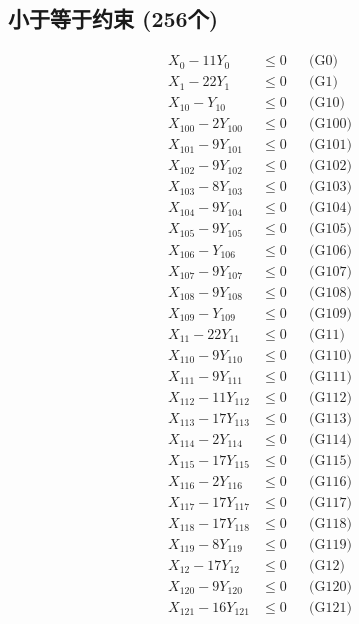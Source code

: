\documentclass[a4paper,10pt]{article}
\begin{document}
\subsection{小于等于约束 (256个)}

\allowdisplaybreaks
{\small\begin{align}
X_{0} - 11Y_{0} &\leq 0 && \text{(G0)} \\
X_{1} - 22Y_{1} &\leq 0 && \text{(G1)} \\
X_{10} - Y_{10} &\leq 0 && \text{(G10)} \\
X_{100} - 2Y_{100} &\leq 0 && \text{(G100)} \\
X_{101} - 9Y_{101} &\leq 0 && \text{(G101)} \\
X_{102} - 9Y_{102} &\leq 0 && \text{(G102)} \\
X_{103} - 8Y_{103} &\leq 0 && \text{(G103)} \\
X_{104} - 9Y_{104} &\leq 0 && \text{(G104)} \\
X_{105} - 9Y_{105} &\leq 0 && \text{(G105)} \\
X_{106} - Y_{106} &\leq 0 && \text{(G106)} \\
X_{107} - 9Y_{107} &\leq 0 && \text{(G107)} \\
X_{108} - 9Y_{108} &\leq 0 && \text{(G108)} \\
X_{109} - Y_{109} &\leq 0 && \text{(G109)} \\
X_{11} - 22Y_{11} &\leq 0 && \text{(G11)} \\
X_{110} - 9Y_{110} &\leq 0 && \text{(G110)} \\
X_{111} - 9Y_{111} &\leq 0 && \text{(G111)} \\
X_{112} - 11Y_{112} &\leq 0 && \text{(G112)} \\
X_{113} - 17Y_{113} &\leq 0 && \text{(G113)} \\
X_{114} - 2Y_{114} &\leq 0 && \text{(G114)} \\
X_{115} - 17Y_{115} &\leq 0 && \text{(G115)} \\
\allowbreak
X_{116} - 2Y_{116} &\leq 0 && \text{(G116)} \\
X_{117} - 17Y_{117} &\leq 0 && \text{(G117)} \\
X_{118} - 17Y_{118} &\leq 0 && \text{(G118)} \\
X_{119} - 8Y_{119} &\leq 0 && \text{(G119)} \\
X_{12} - 17Y_{12} &\leq 0 && \text{(G12)} \\
X_{120} - 9Y_{120} &\leq 0 && \text{(G120)} \\
X_{121} - 16Y_{121} &\leq 0 && \text{(G121)} \\

\end{align}}
\end{document}
